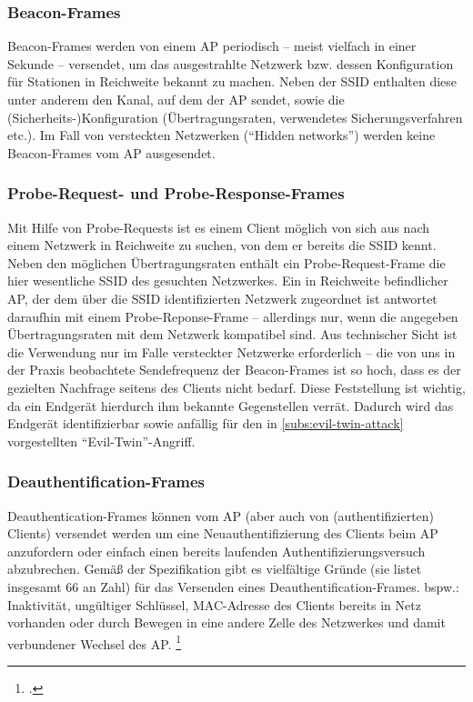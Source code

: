 \subsubsection{Beacon-Frames}
Beacon-Frames werden von einem AP periodisch -- meist vielfach in einer Sekunde -- versendet, um das ausgestrahlte Netzwerk bzw. dessen Konfiguration für Stationen in Reichweite bekannt zu machen. Neben der SSID enthalten diese unter anderem den Kanal, auf dem der AP sendet, sowie die (Sicherheits-)Konfiguration (Übertragungsraten, verwendetes Sicherungsverfahren etc.). Im Fall von versteckten Netzwerken (\enquote{Hidden networks}) werden keine Beacon-Frames vom AP ausgesendet.

\subsubsection{Probe-Request- und Probe-Response-Frames}
Mit Hilfe von Probe-Requests ist es einem Client möglich von sich aus nach einem Netzwerk in Reichweite zu suchen, von dem er bereits die SSID kennt. Neben den möglichen Übertragungsraten enthält ein Probe-Request-Frame die hier wesentliche SSID des gesuchten Netzwerkes. Ein in Reichweite befindlicher AP, der dem über die SSID identifizierten Netzwerk zugeordnet ist antwortet daraufhin mit einem Probe-Reponse-Frame -- allerdings nur, wenn die angegeben Übertragungsraten mit dem Netzwerk kompatibel sind. Aus technischer Sicht ist die Verwendung nur im Falle versteckter Netzwerke erforderlich -- die von uns in der Praxis beobachtete Sendefrequenz der Beacon-Frames ist so hoch, dass es der gezielten Nachfrage seitens des Clients nicht bedarf. Diese Feststellung ist wichtig, da ein Endgerät hierdurch ihm bekannte Gegenstellen verrät. Dadurch wird das Endgerät identifizierbar sowie anfällig für den in \ref{subs:evil-twin-attack} vorgestellten \enquote{Evil-Twin}-Angriff.

\subsubsection{Deauthentification-Frames}\label{subs:deauthentication-frames}
Deauthentication-Frames können vom AP (aber auch von (authentifizierten) Clients) versendet werden um eine Neuauthentifizierung des Clients beim AP anzufordern oder einfach einen bereits laufenden Authentifizierungsversuch abzubrechen. Gemäß der Spezifikation gibt es vielfältige Gründe (sie listet insgesamt 66 an Zahl) für das Versenden eines Deauthentification-Frames. bspw.: Inaktivität, ungültiger Schlüssel, MAC-Adresse des Clients bereits in Netz vorhanden oder durch Bewegen in eine andere Zelle des Netzwerkes und damit verbundener Wechsel des AP. \footcite[S. 74, S. 442]{ieee802.11}

